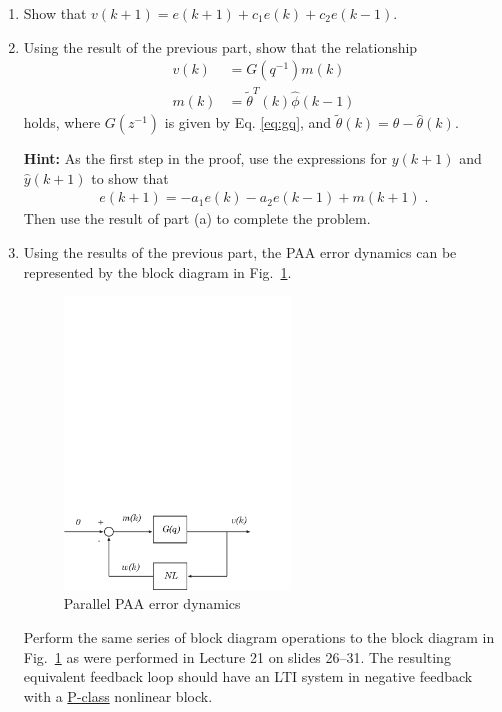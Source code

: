 \begin{enumerate}
    \item
    Show that $v(k+1) = e(k+1) + c_1 e(k) + c_2 e(k-1)$.

    \item
    Using the result of the previous part, show that the relationship
    \begin{equation}
    \begin{aligned}
        v(k) & = G(q^{-1}) m(k) \\
        m(k) & = \tilde{\theta}^T(k) \hat{\phi}(k-1)
    \end{aligned} \label{eq:efl}
    \end{equation}
    holds, where $G(z^{-1})$ is given by Eq. \eqref{eq:gq}, and $\tilde{\theta}(k) = \theta - \hat{\theta}(k)$.

    \textbf{Hint:} As the first step in the proof, use the expressions for $y(k+1)$ and $\hat{y}(k+1)$ to show that
    \begin{align}
        e(k+1) = - a_1 e(k) - a_2 e(k - 1) + m(k+1) \; .
        \label{eq:ek_mk}
    \end{align}
    Then use the result of part (a) to complete the problem.

    \item
    Using the results of the previous part, the PAA error dynamics can be represented by the block diagram in Fig.~\ref{fig:hyperstability_basic_block}.
    \begin{figure}[h]
        \centering
        \includegraphics[width=6cm]{hyperstability_basic_block}
        \caption{Parallel PAA error dynamics}
        \label{fig:hyperstability_basic_block}
    \end{figure}
    Perform the same series of block diagram operations to the block diagram in Fig.~\ref{fig:hyperstability_basic_block} as were performed in Lecture 21 on slides 26--31. The resulting equivalent feedback loop should have an LTI system in negative feedback with a \underline{P-class} nonlinear block.


\end{enumerate}

